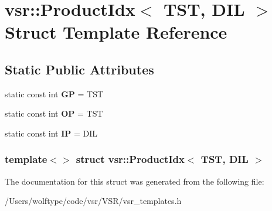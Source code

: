 \hypertarget{structvsr_1_1_product_idx_3_01_t_s_t_00_01_d_i_l_01_4}{\section{vsr\-:\-:Product\-Idx$<$ T\-S\-T, D\-I\-L $>$ Struct Template Reference}
\label{structvsr_1_1_product_idx_3_01_t_s_t_00_01_d_i_l_01_4}
}
\subsection*{Static Public Attributes}
\begin{DoxyCompactItemize}
\item 
\hypertarget{structvsr_1_1_product_idx_3_01_t_s_t_00_01_d_i_l_01_4_ae7d4289342cc3a00eccddfa1a860a827}{static const int {\bfseries G\-P} = T\-S\-T}\label{structvsr_1_1_product_idx_3_01_t_s_t_00_01_d_i_l_01_4_ae7d4289342cc3a00eccddfa1a860a827}

\item 
\hypertarget{structvsr_1_1_product_idx_3_01_t_s_t_00_01_d_i_l_01_4_ad9496b650c2e98b7ba293e4f59408870}{static const int {\bfseries O\-P} = T\-S\-T}\label{structvsr_1_1_product_idx_3_01_t_s_t_00_01_d_i_l_01_4_ad9496b650c2e98b7ba293e4f59408870}

\item 
\hypertarget{structvsr_1_1_product_idx_3_01_t_s_t_00_01_d_i_l_01_4_a5eeec85cda181e7f018aebd41bd535c7}{static const int {\bfseries I\-P} = D\-I\-L}\label{structvsr_1_1_product_idx_3_01_t_s_t_00_01_d_i_l_01_4_a5eeec85cda181e7f018aebd41bd535c7}

\end{DoxyCompactItemize}
\subsubsection*{template$<$$>$ struct vsr\-::\-Product\-Idx$<$ T\-S\-T, D\-I\-L $>$}



The documentation for this struct was generated from the following file\-:\begin{DoxyCompactItemize}
\item 
/\-Users/wolftype/code/vsr/\-V\-S\-R/vsr\-\_\-templates.\-h\end{DoxyCompactItemize}
